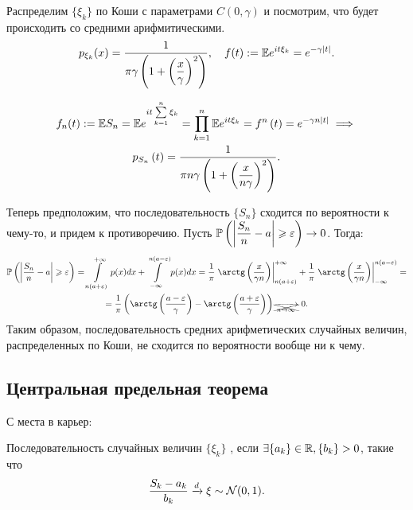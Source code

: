 \documentclass[../TV&MS.tex]{subfiles}
\begin{document}
\begin{Ex}
    Распределим $\{ \xi_k \}$ по Коши с параметрами $C(0, \gamma)$ и посмотрим, 
    что будет происходить со средними арифмитическими.
\[
    p_{\xi_k} (x) = \dfrac{1}{\pi \gamma \left( 1 + \left( \dfrac{x}{\gamma} 
    \right)^2 \right) }, \quad f(t) :=  \mathbb{E} e^{it\xi_k} = e^{-\gamma \left| t \right| }.
\]

\begin{multline*}
    f_n(t) := \mathbb{E} S_n = \mathbb{E} e^{it \sum\limits_{k=1}^{n} \xi_k} = 
    \prod\limits_{k=1}^{n} \mathbb{E} e^{it\xi_k} = f^{n} \left( t \right) =
    e^{-\gamma n \left| t \right| } \implies \\
    p_{S_n} \left( t \right) = \dfrac{1}{\pi n \gamma \left( 1 + \left( 
    \dfrac{x}{n \gamma} \right)^2 \right) }.
\end{multline*}
    
    Теперь предположим, что последовательность $\{ S_n \} $ сходится по вероятности к 
    чему-то, и придем к противоречию. Пусть $\mathbb{P} \left( \left| \dfrac{S_n}{n} - a \right| 
    \geqslant \varepsilon \right) \rightarrow 0$. Тогда:
\begin{multline*}
	\Pro \left( \left| \dfrac{S_n}{n} - a \right| \geqslant \varepsilon \right) = 
	\int\limits_{n(a+\varepsilon)}^{+\infty} p(x)dx + \int\limits_{-\infty}^{n(a - 
	\varepsilon)} p(x)dx = \dfrac{1}{\pi} \left. \arctg \left( \dfrac{x}{\gamma n} \right) 
	\right|_{n(a+\varepsilon)}^{+\infty} + \dfrac{1}{\pi} \left. \arctg \left( 
	\dfrac{x}{\gamma n} \right) \right|_{-\infty}^{n(a - \varepsilon)} = \\
    = \dfrac{1}{\pi} \left( \arctg \left( \dfrac{a - \varepsilon}{\gamma} \right) - 
    \arctg \left( \dfrac{a + \varepsilon}{\gamma} \right)  \right) 
    \xcancel{ \xrightarrow[n \rightarrow \infty]{}} \ 0.
\end{multline*}
    Таким образом, последовательность средних арифметических случайных величин, 
    распределенных по Коши, не сходится по вероятности вообще ни к чему.
\end{Ex} 

\subsection{Центральная предельная теорема}

	С места в карьер:

\begin{Def}
    Последовательность случайных величин $\{ \xi_k \}$ , 
    если $\exists \{ a_k \} \in \mathbb{R}, \{ b_k \} > 0$, такие что 
\[
    \dfrac{S_k - a_k}{b_k} \xrightarrow[]{d} \xi \sim \mathcal{N}(0, 1).
\] 
\end{Def}
\end{document}
